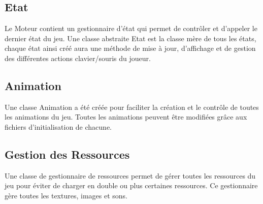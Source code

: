 \documentclass[a4paper]{article}
\newcommand{\alinea}{\hspace*{0.5cm}}
\begin{document}
      \subsection{Etat}
        \alinea Le Moteur contient un gestionnaire d'état qui permet de contrôler et d'appeler le dernier état du jeu. Une classe abstraite Etat est la classe mère de tous les états, chaque état ainsi créé aura une méthode de mise à jour, d'affichage et de gestion des différentes actions clavier/souris du joueur.
        
      \subsection{Animation}
        \alinea Une classe Animation a été créée pour faciliter la création et le contrôle de toutes les animations du jeu. Toutes les animations peuvent être modifiées grâce aux fichiers d'initialisation de chacune.
        
      \subsection{Gestion des Ressources}
        \alinea Une classe de gestionnaire de ressources permet de gérer toutes les ressources du jeu pour éviter de charger en double ou plus certaines ressources. Ce gestionnaire gère toutes les textures, images et sons.
\end{document}
